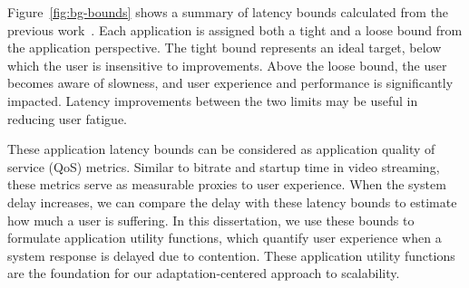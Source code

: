Figure~\ref{fig:bg-bounds} shows a summary of latency bounds calculated from the
previous work~\cite{chen2017empirical}. Each application is assigned both a
tight and a loose bound from the application perspective. The tight bound
represents an ideal target, below which the user is insensitive to improvements.
Above the loose bound, the user becomes aware of slowness, and user experience
and performance is significantly impacted. Latency improvements between the two
limits may be useful in reducing user fatigue.

These application latency bounds can be considered as application quality of
service (QoS) metrics. Similar to bitrate and startup time in video streaming,
these metrics serve as measurable proxies to user experience. When the system
delay increases, we can compare the delay with these latency bounds to estimate
how much a user is suffering. In this dissertation, we use these bounds to
formulate application utility functions, which quantify user experience when a
system response is delayed due to contention. These application utility
functions are the foundation for our adaptation-centered approach to
scalability.


